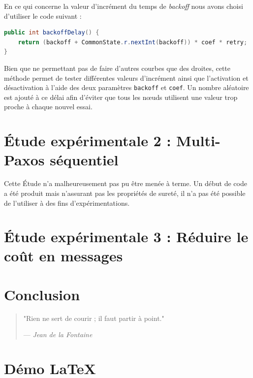 \documentclass[french]{article}
\begin{document}
En ce qui concerne la valeur d'incrément du temps de \emph{backoff} nous avons choisi d'utiliser le code suivant :

\begin{lstlisting}[language=java]
public int backoffDelay() {
	return (backoff + CommonState.r.nextInt(backoff)) * coef * retry;
}
\end{lstlisting}

Bien que ne permettant pas de faire d'autres courbes que des droites, cette méthode permet de tester différentes valeurs d'incrément ainsi que l'activation et désactivation à l'aide des deux paramètres \lstinline{backoff} et \lstinline{coef}.
Un nombre aléatoire est ajouté à ce délai afin d'éviter que tous les nœuds utilisent une valeur trop proche à chaque nouvel essai.



\section{Étude expérimentale 2 : Multi-Paxos séquentiel}

Cette Étude n'a malheureusement pas pu être menée à terme.
Un début de code a été produit mais n'assurant pas les propriétés de sureté, il n'a pas été possible de l'utiliser à des fins d'expérimentations.

\section{Étude expérimentale 3 : Réduire le coût en messages}

\section*{Conclusion}

\begin{quotation}
	"Rien ne sert de courir ; il faut partir à point."

	--- \emph{Jean de la Fontaine}
\end{quotation}









\section{Démo \LaTeX}
\end{document}
